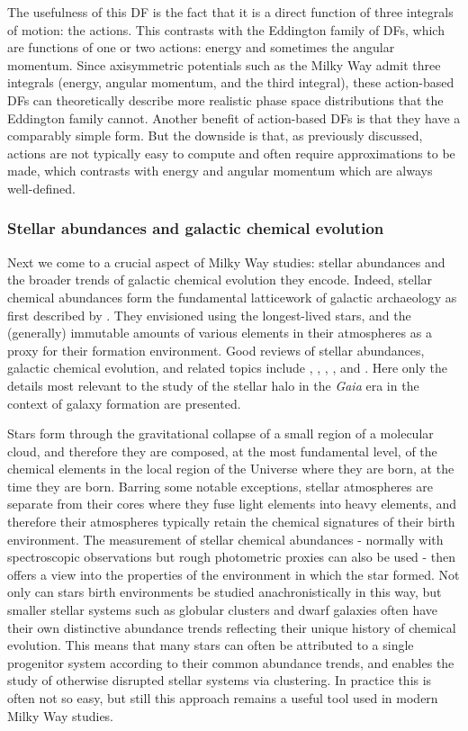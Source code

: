 The usefulness of this DF is the fact that it is a direct function of three integrals of motion: the actions. This contrasts with the Eddington family of DFs, which are functions of one or two actions: energy and sometimes the angular momentum. Since axisymmetric potentials such as the Milky Way admit three integrals (energy, angular momentum, and the third integral), these action-based DFs can theoretically describe more realistic phase space distributions that the Eddington family cannot. Another benefit of action-based DFs is that they have a comparably simple form. But the downside is that, as previously discussed, actions are not typically easy to compute and often require approximations to be made, which contrasts with energy and angular momentum which are always well-defined.

\subsubsection{Stellar abundances and galactic chemical evolution}

Next we come to a crucial aspect of Milky Way studies: stellar abundances and the broader trends of galactic chemical evolution they encode. Indeed, stellar chemical abundances form the fundamental latticework of galactic archaeology as first described by \textcite{freeman02}. They envisioned using the longest-lived stars, and the (generally) immutable amounts of various elements in their atmospheres as a proxy for their formation environment. Good reviews of stellar abundances, galactic chemical evolution, and related topics include  \textcite{tolstoy09}, \textcite{asplund09}, \textcite{nomoto13}, \textcite{frebel15}, and \textcite{kobayashi23}. Here only the details most relevant to the study of the stellar halo in the \textit{Gaia} era in the context of galaxy formation are presented.

Stars form through the gravitational collapse of a small region of a molecular cloud, and therefore they are composed, at the most fundamental level, of the chemical elements in the local region of the Universe where they are born, at the time they are born. Barring some notable exceptions, stellar atmospheres are separate from their cores where they fuse light elements into heavy elements, and therefore their atmospheres typically retain the chemical signatures of their birth environment. The measurement of stellar chemical abundances - normally with spectroscopic observations but rough photometric proxies can also be used - then offers a view into the properties of the environment in which the star formed. Not only can stars birth environments be studied anachronistically in this way, but smaller stellar systems such as globular clusters and dwarf galaxies often have their own distinctive abundance trends reflecting their unique history of chemical evolution. This means that many stars can often be attributed to a single progenitor system according to their common abundance trends, and enables the study of otherwise disrupted stellar systems via clustering. In practice this is often not so easy, but still this approach remains a useful tool used in modern Milky Way studies.

